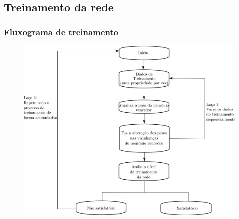 \documentclass[10pt]{beamer} %
\begin{document}
\subsection{Treinamento da rede}
\begin{frame}
	\frametitle{Fluxograma de treinamento}
	\begin{scriptsize}
		

	\begin{figure}[H]
		\centering
	
			\includegraphics[scale=0.4]{Imagens/treinamento.png}
	\end{figure}
\end{scriptsize}
\end{frame}
\end{document}
